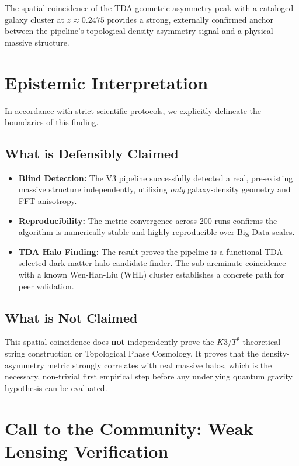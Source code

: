 \documentclass[aps,prd,twocolumn,nofootinbib,superscriptaddress,10pt]{revtex4-2}
\begin{document}
The spatial coincidence of the TDA geometric-asymmetry peak with a cataloged galaxy cluster at $z \approx 0.2475$ provides a strong, externally confirmed anchor between the pipeline's topological density-asymmetry signal and a physical massive structure.

\section{Epistemic Interpretation}

In accordance with strict scientific protocols, we explicitly delineate the boundaries of this finding.

\subsection{What is Defensibly Claimed}
\begin{itemize}
    \item \textbf{Blind Detection:} The V3 pipeline successfully detected a real, pre-existing massive structure independently, utilizing \textit{only} galaxy-density geometry and FFT anisotropy.
    \item \textbf{Reproducibility:} The metric convergence across 200 runs confirms the algorithm is numerically stable and highly reproducible over Big Data scales.
    \item \textbf{TDA Halo Finding:} The result proves the pipeline is a functional TDA-selected dark-matter halo candidate finder. The sub-arcminute coincidence with a known Wen-Han-Liu (WHL) cluster establishes a concrete path for peer validation.
\end{itemize}

\subsection{What is Not Claimed}
This spatial coincidence does \textbf{not} independently prove the $K3/T^2$ theoretical string construction or Topological Phase Cosmology. It proves that the density-asymmetry metric strongly correlates with real massive halos, which is the necessary, non-trivial first empirical step before any underlying quantum gravity hypothesis can be evaluated.

\section{Call to the Community: Weak Lensing Verification}
\end{document}
